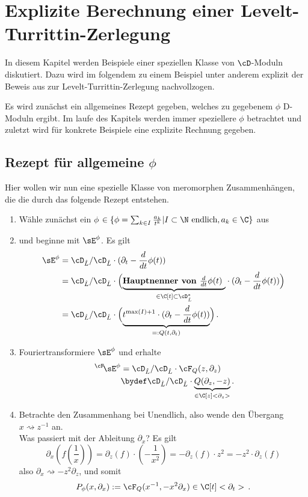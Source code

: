 \chapter{Explizite Berechnung einer Levelt-Turrittin-Zerlegung}
In diesem Kapitel werden Beispiele einer speziellen Klasse von $\cD$-Moduln
diskutiert. Dazu wird im folgendem zu einem Beispiel unter anderem explizit der
Beweis aus \cite{sabbah_cimpa90} zur Levelt-Turrittin-Zerlegung nachvollzogen.

Es wird zunächst ein allgemeines Rezept gegeben, welches zu gegebenem $\phi$
D-Moduln ergibt. Im laufe des Kapitels werden immer speziellere $\phi$
betrachtet und zuletzt wird für konkrete Beispiele eine explizite Rechnung
gegeben.

\section{Rezept für allgemeine $\phi$} \label{sec:allgemeinProblem}
Hier wollen wir nun eine spezielle Klasse von meromorphen Zusammenhängen, die
die durch das folgende Rezept entstehen.
\begin{enumerate}
\item Wähle zunächst ein $\phi$
$\in\{\phi=\sum_{k\in I}\frac{a_k}{t^{k}}|I\subset\N\mbox{ endlich}
,a_k\in \C\}$
aus
\item und beginne mit $\sE^{\phi}$. Es gilt
\begin{align*}
\sE^{\phi} &= \cD_{\hat L}/\cD_{\hat L}\cdot (\partial_t-\frac{d}{dt}\phi(t))
\\&=\cD_{\hat L}/\cD_{\hat L}\cdot \Big(\underset{\in\C[t]\subset\cD_{\hat L}^*}
    {\underbrace{\mbox{\textbf{Hauptnenner von $\frac{d}{dt}\phi(t)$ }}}}
  \cdot (\partial_t-\frac{d}{dt}\phi(t))\Big)
\\&=\cD_{\hat L}/\cD_{\hat L}\cdot \Big(
  \underset{=:Q(t,\partial_t)}{\underbrace{
  t^{\max(I)+1} \cdot (\partial_t-\frac{d}{dt}\phi(t))}}\Big) \,.
\end{align*}
\begin{comment}
Dies ändert den meromorphen Zusammenhang nicht, weil $t^{\max(I)+1}$ eine
Einheit in $\cD_{\hat L}$ (und auch in $\cD_{L}$) ist.
\end{comment}
\item Fouriertransformiere $\sE^{\phi}$ und erhalte
\begin{align*}
\,^\cF\!\sE^{\phi}&=\cD_{\hat L}/\cD_{\hat L}\cdot{\cF_Q(z,\partial_z)}
\\&\bydef \cD_{\hat L}/\cD_{\hat L}\cdot
  \underset{\in\C[z]<\partial_z>}{\underbrace{Q(\partial_z,-z)}} \,.
\end{align*}
\item Betrachte den Zusammenhang bei Unendlich, also wende den Übergang
$x\rightsquigarrow z^{-1}$ an.\\
Was passiert mit der Ableitung $\partial_x$?
Es gilt
\[
\partial_x (f(\frac{1}{x}))=
\partial_z(f)\cdot (-\frac{1}{x^2})=
-\partial_z(f)\cdot z^2= %
- z^2 \cdot \partial_z(f)
\]
also $ \partial_x\rightsquigarrow-z^2\partial_z $, und somit
\[
P_\phi(x,\partial_x):=\cF_Q(x^{-1},-x^2\partial_x) \in \C[t]<\partial_t> \,.
\]
\end{enumerate}
